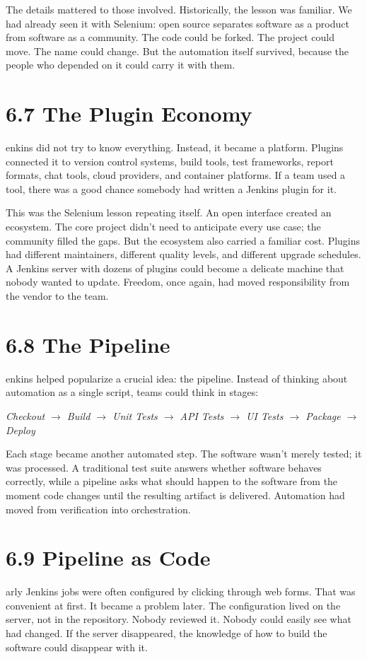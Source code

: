 \documentclass[11pt, a4paper, openany]{book}
\newcommand{\initialcap}[1]{{\fontfamily{lmss}\selectfont\huge\textbf{#1}}}
\begin{document}
\noindent The details mattered to those involved. Historically, the lesson was familiar. We had already seen it with Selenium: open source separates software as a product from software as a community. The code could be forked. The project could move. The name could change. But the automation itself survived, because the people who depended on it could carry it with them.

\section{6.7 The Plugin Economy}
\noindent \initialcap{J}enkins did not try to know everything. Instead, it became a platform. Plugins connected it to version control systems, build tools, test frameworks, report formats, chat tools, cloud providers, and container platforms. If a team used a tool, there was a good chance somebody had written a Jenkins plugin for it.

\noindent This was the Selenium lesson repeating itself. An open interface created an ecosystem. The core project didn't need to anticipate every use case; the community filled the gaps. But the ecosystem also carried a familiar cost. Plugins had different maintainers, different quality levels, and different upgrade schedules. A Jenkins server with dozens of plugins could become a delicate machine that nobody wanted to update. Freedom, once again, had moved responsibility from the vendor to the team.

\section{6.8 The Pipeline}
\noindent \initialcap{J}enkins helped popularize a crucial idea: the pipeline. Instead of thinking about automation as a single script, teams could think in stages:
\begin{center}
\textit{Checkout $\rightarrow$ Build $\rightarrow$ Unit Tests $\rightarrow$ API Tests $\rightarrow$ UI Tests $\rightarrow$ Package $\rightarrow$ Deploy}
\end{center}
Each stage became another automated step. The software wasn't merely tested; it was processed. A traditional test suite answers whether software behaves correctly, while a pipeline asks what should happen to the software from the moment code changes until the resulting artifact is delivered. Automation had moved from verification into orchestration.

\section{6.9 Pipeline as Code}
\noindent \initialcap{E}arly Jenkins jobs were often configured by clicking through web forms. That was convenient at first. It became a problem later. The configuration lived on the server, not in the repository. Nobody reviewed it. Nobody could easily see what had changed. If the server disappeared, the knowledge of how to build the software could disappear with it.
\end{document}
